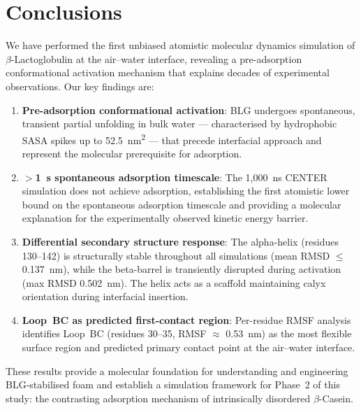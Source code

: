 \documentclass[journal=langd5,manuscript=article]{achemso}
\begin{document}
\section{Conclusions}

We have performed the first unbiased atomistic molecular dynamics simulation
of $\beta$-Lactoglobulin at the air--water interface, revealing a
pre-adsorption conformational activation mechanism that explains decades of
experimental observations. Our key findings are:

\begin{enumerate}
  \item \textbf{Pre-adsorption conformational activation}: BLG undergoes
        spontaneous, transient partial unfolding in bulk water --- characterised
        by hydrophobic SASA spikes up to \SI{52.5}{\nano\metre\squared} --- that
        precede interfacial approach and represent the molecular prerequisite
        for adsorption.

  \item \textbf{$>$1~\textmu{}s spontaneous adsorption timescale}: The 1{,}000~ns
        CENTER simulation does not achieve adsorption, establishing the first
        atomistic lower bound on the spontaneous adsorption timescale and
        providing a molecular explanation for the experimentally observed kinetic
        energy barrier.

  \item \textbf{Differential secondary structure response}: The alpha-helix
        (residues 130--142) is structurally stable throughout all simulations
        (mean RMSD $\leq$\SI{0.137}{\nano\metre}), while the beta-barrel is
        transiently disrupted during activation (max RMSD \SI{0.502}{\nano\metre}).
        The helix acts as a scaffold maintaining calyx orientation during
        interfacial insertion.

  \item \textbf{Loop~BC as predicted first-contact region}: Per-residue RMSF
        analysis identifies Loop~BC (residues 30--35, RMSF $\approx$
        \SI{0.53}{\nano\metre}) as the most flexible surface region and
        predicted primary contact point at the air--water interface.
\end{enumerate}

These results provide a molecular foundation for understanding and engineering
BLG-stabilised foam and establish a simulation framework for Phase~2 of this
study: the contrasting adsorption mechanism of intrinsically disordered
$\beta$-Casein.

\begin{acknowledgement}
\end{acknowledgement}


\end{document}
